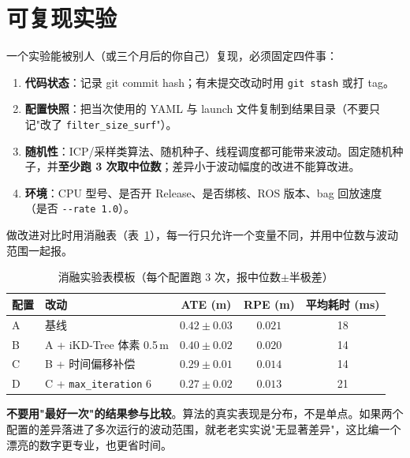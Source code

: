 \section{可复现实验}\label{sec:28-repro}

一个实验能被别人（或三个月后的你自己）复现，必须固定四件事：

\begin{enumerate}
  \item \textbf{代码状态}：记录 git commit hash；有未提交改动时用 \lstinline{git stash} 或打 tag。
  \item \textbf{配置快照}：把当次使用的 YAML 与 launch 文件复制到结果目录（不要只记"改了 \lstinline{filter_size_surf}"）。
  \item \textbf{随机性}：ICP/采样类算法、随机种子、线程调度都可能带来波动。固定随机种子，并\textbf{至少跑 3 次取中位数}；差异小于波动幅度的改进不能算改进。
  \item \textbf{环境}：CPU 型号、是否开 Release、是否绑核、ROS 版本、bag 回放速度（是否 \lstinline{--rate 1.0}）。
\end{enumerate}

做改进对比时用消融表（表~\ref{tab:28-ablation}），每一行只允许一个变量不同，并用中位数与波动范围一起报。

\begin{table}[htbp]
  \centering
  \caption{消融实验表模板（每个配置跑 3 次，报中位数$\pm$半极差）}\label{tab:28-ablation}
  \small
  \begin{tabular}{llccc}
    \toprule
    配置 & 改动 & ATE (m) & RPE (m) & 平均耗时 (ms) \\
    \midrule
    A & 基线 & $0.42\pm0.03$ & $0.021$ & 18 \\
    B & A + iKD-Tree 体素 0.5\,m & $0.40\pm0.02$ & $0.020$ & 14 \\
    C & B + 时间偏移补偿 & $0.29\pm0.01$ & $0.014$ & 14 \\
    D & C + \lstinline{max_iteration} 6 & $0.27\pm0.02$ & $0.013$ & 21 \\
    \bottomrule
  \end{tabular}
\end{table}

\begin{note}
\textbf{不要用"最好一次"的结果参与比较}。算法的真实表现是分布，不是单点。如果两个配置的差异落进了多次运行的波动范围，就老老实实说"无显著差异"，这比编一个漂亮的数字更专业，也更省时间。
\end{note}

